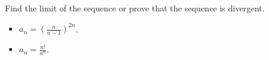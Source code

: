\begin{enumerate}
Find the limit of the sequence or prove that the sequence is divergent.
\begin{itemize}
\item $a_n=\left(\frac{n}{n-1}\right)^{2n}$.
\item $a_n=\frac{n!}{n^n}$.
\end{itemize}
\end{enumerate}